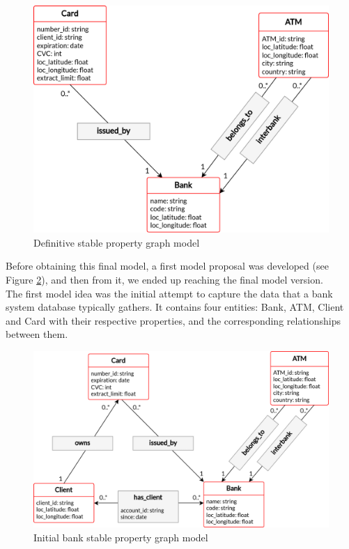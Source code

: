 \documentclass{article}
\begin{document}
\begin{figure}[H]
  \centering
  \includegraphics[scale = 0.7]{images/PG-stable-1-edit-cardinal.png}
  \caption{Definitive stable property graph model}
  \label{img:pg-stable-def}
\end{figure}

Before obtaining this final model, a first model proposal was developed (see Figure \ref{img:initial-pg-stable}), and then from it, we ended up reaching the final model version.\\

The first model idea was the initial attempt to capture the data that a bank system database typically gathers.
It contains four entities: Bank, ATM, Client and Card with their respective properties, and the corresponding relationships between them.

\begin{figure}[H]
  \centering
  \includegraphics[scale = 0.7]{images/PG-stable-edit-cardinal.png}
  \caption{Initial bank stable property graph model}
  \label{img:initial-pg-stable}
\end{figure}
\end{document}
